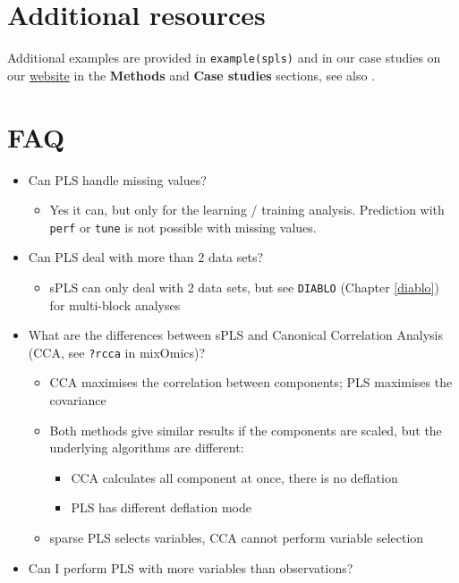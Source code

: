 \documentclass[]{book}
\providecommand{\tightlist}{%
  \setlength{\itemsep}{0pt}\setlength{\parskip}{0pt}}
\begin{document}
\hypertarget{additional-resources-2}{%
\section{Additional resources}\label{additional-resources-2}}

Additional examples are provided in \texttt{example(spls)} and in our case studies on our \href{http://www.mixomics.org}{website} in the \textbf{Methods} and \textbf{Case studies} sections, see also \citep{Lec08, Lec09a}.

\hypertarget{faq-2}{%
\section{FAQ}\label{faq-2}}

\begin{itemize}
\tightlist
\item
  Can PLS handle missing values?

  \begin{itemize}
  \tightlist
  \item
    Yes it can, but only for the learning / training analysis. Prediction with \texttt{perf} or \texttt{tune} is not possible with missing values.
  \end{itemize}
\item
  Can PLS deal with more than 2 data sets?

  \begin{itemize}
  \tightlist
  \item
    sPLS can only deal with 2 data sets, but see \texttt{DIABLO} (Chapter \ref{diablo}) for multi-block analyses
  \end{itemize}
\item
  What are the differences between sPLS and Canonical Correlation Analysis (CCA, see \texttt{?rcca} in mixOmics)?

  \begin{itemize}
  \tightlist
  \item
    CCA maximises the correlation between components; PLS maximises the covariance
  \item
    Both methods give similar results if the components are scaled, but the underlying algorithms are different:

    \begin{itemize}
    \tightlist
    \item
      CCA calculates all component at once, there is no deflation
    \item
      PLS has different deflation mode
    \end{itemize}
  \item
    sparse PLS selects variables, CCA cannot perform variable selection
  \end{itemize}
\item
  Can I perform PLS with more variables than observations?


\end{itemize}
\end{document}
